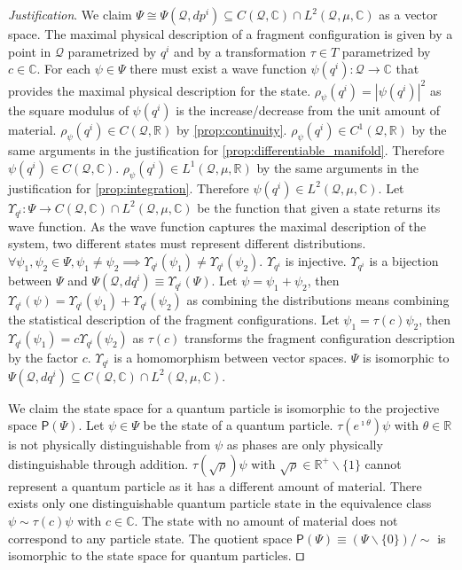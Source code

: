 \documentclass[smallextended]{svjour3}
\numberwithin{equation}{section}
\newenvironment{justification}{\emph{Justification}.}{\hfill\(\qed\)}
\theoremstyle{definition}
\newenvironment{justification}{\emph{Justification}.}{\qed}
\begin{document}
\begin{justification}
	We claim $\Psi \cong \Psi(\mathcal{Q}, dp^i) \subseteq C(\mathcal{Q}, \mathbb{C}) \cap L^2(\mathcal{Q}, \mu, \mathbb{C})$ as a vector space. The maximal physical description of a fragment configuration is given by a point in $\mathcal{Q}$ parametrized by $q^i$ and by a transformation $\tau \in T$ parametrized by $c \in \mathbb{C}$. For each $\psi \in \Psi$ there must exist a wave function $\psi(q^i) : \mathcal{Q} \rightarrow \mathbb{C}$ that provides the maximal physical description for the state. $\rho_\psi(q^i) = |\psi(q^i)|^2$ as the square modulus of $\psi(q^i)$ is the increase/decrease from the unit amount of material. $\rho_\psi(q^i) \in C(\mathcal{Q}, \mathbb{R})$ by \ref{prop:continuity}. $\rho_\psi(q^i) \in C^1(\mathcal{Q}, \mathbb{R})$ by the same arguments in the justification for \ref{prop:differentiable_manifold}. Therefore $\psi(q^i) \in C(\mathcal{Q}, \mathbb{C})$. $\rho_\psi(q^i) \in L^1(\mathcal{Q}, \mu, \mathbb{R})$ by the same arguments in the justification for \ref{prop:integration}. Therefore $\psi(q^i) \in L^2(\mathcal{Q}, \mu, \mathbb{C})$. Let $\Upsilon_{q^i} : \Psi \rightarrow C(\mathcal{Q}, \mathbb{C}) \cap L^2(\mathcal{Q}, \mu, \mathbb{C})$ be the function that given a state returns its wave function. As the wave function captures the maximal description of the system, two different states must represent different distributions. $\forall \psi_1, \psi_2 \in \Psi, \psi_1 \neq \psi_2 \implies \Upsilon_{q^i}(\psi_1) \neq \Upsilon_{q^i}(\psi_2)$. $\Upsilon_{q^i}$ is injective. $\Upsilon_{q^i}$ is a bijection between $\Psi$ and $\Psi(\mathcal{Q}, dq^i)\equiv\Upsilon_{q^i}(\Psi)$. Let $\psi=\psi_1+\psi_2$, then $\Upsilon_{q^i}(\psi)=\Upsilon_{q^i}(\psi_1)+\Upsilon_{q^i}(\psi_2)$ as combining the distributions means combining the statistical description of the fragment configurations. Let $\psi_1=\tau(c)\psi_2$, then $\Upsilon_{q^i}(\psi_1)=c \Upsilon_{q^i}(\psi_2)$ as $\tau(c)$ transforms the fragment configuration description by the factor $c$. $\Upsilon_{q^i}$ is a homomorphism between vector spaces. $\Psi$ is isomorphic to $\Psi(\mathcal{Q}, dq^i) \subseteq C(\mathcal{Q}, \mathbb{C}) \cap L^2(\mathcal{Q}, \mu, \mathbb{C})$.
	
	We claim the state space for a quantum particle is isomorphic to the projective space $\mathsf{P}(\Psi)$. Let $\psi \in \Psi$ be the state of a quantum particle. $\tau(e^{\imath \theta}) \psi$ with $\theta \in \mathbb{R}$ is not physically distinguishable from $\psi$ as phases are only physically distinguishable through addition. $\tau(\sqrt{\rho}) \psi$ with $\sqrt{\rho} \in \mathbb{R}^+ \backslash \{1\}$ cannot represent a quantum particle as it has a different amount of material. There exists only one distinguishable quantum particle state in the equivalence class $\psi \sim \tau(c) \psi$ with $c \in \mathbb{C}$. The state with no amount of material does not correspond to any particle state. The quotient space $\mathsf{P}(\Psi) \equiv (\Psi \backslash \{0\}) / \sim$ is isomorphic to the state space for quantum particles.
\end{justification}
\end{document}
